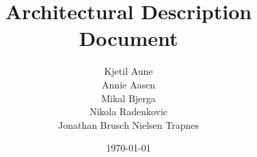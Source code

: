 \newcommand{\mytitle}{Architectural 
Description Document}
\newcommand{\mygroupnumber}{A6\\Android}
\newcommand{\myauthor}{Kjetil Aune\\Annie Aasen\\Mikal Bjerga\\Nikola Radenkovic\\Jonathan Brusch Nielsen Trapnes}

\title{\mytitle}
\author{\myauthor}
\date{\today}
